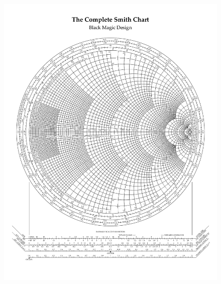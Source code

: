 \documentclass[12pt,a4paper]{article}
\begin{document}
\begin{figure}[H]
\centering
\vspace{4cm}
\hspace*{-1.6cm}
\includegraphics[scale=1.0,trim=1cm 2cm 1cm 3cm, clip]{./SmithChart}
\label{fig:SmithChart3}
\end{figure}
\end{document}
